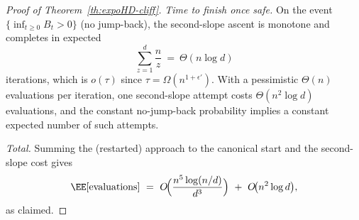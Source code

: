 \begin{proof}[Proof of Theorem~\ref{th:expoHD-cliff}]
	\smallskip
	\emph{Time to finish once safe.}
	On the event $\{\inf_{t\ge 0} B_t>0\}$ (no jump-back), the second-slope ascent is monotone and completes in expected
	\[
	\sum_{z=1}^{d}\frac{n}{z}\ =\ \Theta(n\log d)
	\]
	iterations, which is $o(\tau)$ since $\tau=\Omega(n^{1+\epsilon'})$. With a pessimistic $\Theta(n)$ evaluations per iteration, one second-slope attempt costs $\Theta(n^{2}\log d)$ evaluations, and the constant no-jump-back probability implies a constant expected number of such attempts.
	
	\smallskip
	\emph{Total.}
	Summing the (restarted) approach to the canonical start and the second-slope cost gives
	\[
	\EE[\text{evaluations}]
	\ =\ O\!\Big(\frac{n^{5}\log(n/d)}{d^{3}}\Big)\ +\ O\!\big(n^{2}\log d\big),
	\]
	as claimed.
\end{proof}
